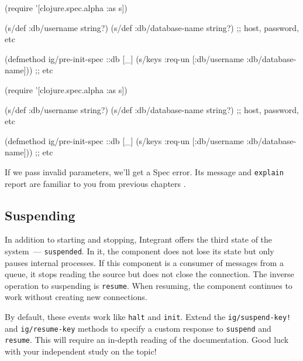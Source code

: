 \begin{english}
  \begin{clojure}
(require '[clojure.spec.alpha :as s])

(s/def :db/username string?)
(s/def :db/database-name string?)
;; host, password, etc

(defmethod ig/pre-init-spec ::db [_]
  (s/keys :req-un [:db/username
                   :db/database-name]))
                   ;; etc
  \end{clojure}
\end{english}

\else

\begin{english}
  \begin{clojure}
(require '[clojure.spec.alpha :as s])

(s/def :db/username string?)
(s/def :db/database-name string?)
;; host, password, etc

(defmethod ig/pre-init-spec ::db [_]
  (s/keys :req-un [:db/username
                   :db/database-name])) ;; etc
  \end{clojure}
\end{english}

\fi

\noindent
If we pass invalid parameters, we'll get a Spec error. Its message and \verb|explain| report are familiar to you from previous chapters .

\subsection{Suspending}


In addition to starting and stopping, Integrant offers the third state of the system~--- \verb|suspended|. In it, the component does not lose its state but only pauses internal processes. If this component is a consumer of messages from a queue, it stops reading the source but does not close the connection. The inverse operation to suspending is \verb|resume|. When resuming, the component continues to work without creating new connections.


By default, these events work like \verb|halt| and \verb|init|. Extend the \texttt{ig/sus\-pend\--key!} and \verb|ig/resume-key| methods to specify a custom response to \verb|suspend| and \verb|resume|. This will require an in-depth reading of the documentation. Good luck with your independent study on the topic!

